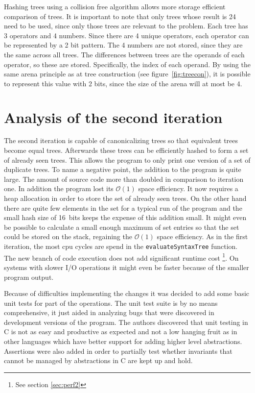 \documentclass[11pt,a4paper]{article}
\newcommand{\code}[1]{\texttt{#1}}
\begin{document}
Hashing trees using a collision free algorithm allows more storage
efficient comparison of trees. 
It is important to note that only trees whose result is 24 need to be used, 
since only those trees are relevant to the problem.
Each tree has 3 operators and 4 numbers. Since there are 4 unique operators, 
each operator can be represented by a 2 bit pattern. 
The 4 numbers are not stored, since they are the same across all trees. 
The differences between trees are the operands of each operator, so these are stored. 
Specifically, the index of each operand. 
By using the same arena principle as at tree construction (see figure~\ref{fig:treecon}), it is 
possible to represent this value with 2 bits, since the size of the arena will at most be 4. 

\section{Analysis of the second iteration}

The second iteration is capable of canonicalizing trees so that
equivalent trees become equal trees.
Afterwards these trees can be efficiently hashed to form a set of
already seen trees.
This allows the program to only print one version of a set of
duplicate trees.
To name a negative point, the addition to the program is quite large.
The amount of source code more than doubled in comparison to iteration
one.
In addition the program lost its $\mathcal{O}(1)$ space efficiency.
It now requires a heap allocation in order to store the set of already
seen trees.
On the other hand there are quite few elements in the set for a
typical run of the program and the small hash size of 16~bits keeps
the expense of this addition small.
It might even be possible to calculate a small enough maximum of set
entries so that the set could be stored on the stack, regaining the
$\mathcal{O}(1)$ space efficiency.
As in the first iteration, the most cpu cycles are spend in the
\code{evaluateSyntaxTree} function.
The new branch of code execution does not add significant runtime
cost \footnote{See section \ref{sec:perf2}}.
On systems with slower I/O operations it might even be faster because
of the smaller program output.

Because of difficulties implementing the changes it was decided to add
some basic unit tests for part of the operations. The unit test suite
is by no means comprehensive, it just aided in analyzing bugs that
were discovered in development versions of the program.
The authors discovered that unit testing in C is not as easy and
productive as expected and not a low hanging fruit as in other
languages which have better support for adding higher level
abstractions.
Assertions were also added in order to partially test whether
invariants that cannot be managed by abstractions in C are kept up and
hold.
\end{document}
